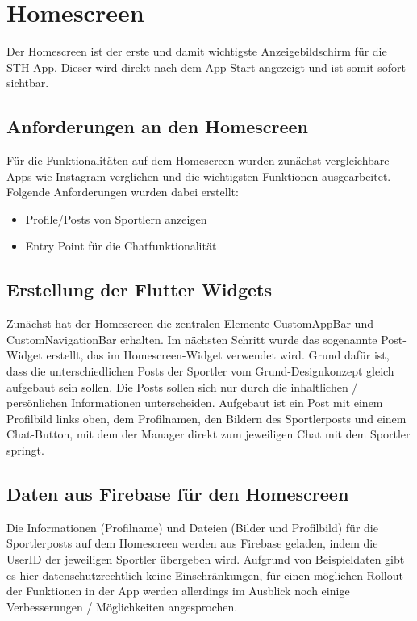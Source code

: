 \chapter{Homescreen}
Der Homescreen ist der erste und damit wichtigste Anzeigebildschirm für die STH-App. 
Dieser wird direkt nach dem App Start angezeigt und ist somit sofort sichtbar.
\section{Anforderungen an den Homescreen}
Für die Funktionalitäten auf dem Homescreen wurden zunächst vergleichbare Apps wie Instagram verglichen und die wichtigsten Funktionen ausgearbeitet.\newline
Folgende Anforderungen wurden dabei erstellt:
\begin{itemize}
    \item Profile/Posts von Sportlern anzeigen
    \item Entry Point für die Chatfunktionalität
\end{itemize}

\section{Erstellung der Flutter Widgets}
Zunächst hat der Homescreen die zentralen Elemente CustomAppBar und CustomNavigationBar erhalten.
Im nächsten Schritt wurde das sogenannte Post-Widget erstellt, das im Homescreen-Widget verwendet wird.
Grund dafür ist, dass die unterschiedlichen Posts der Sportler vom Grund-Designkonzept gleich aufgebaut sein sollen. 
Die Posts sollen sich nur durch die inhaltlichen / persönlichen Informationen unterscheiden.\newline
Aufgebaut ist ein Post mit einem Profilbild links oben, dem Profilnamen, den Bildern des Sportlerposts und einem Chat-Button, mit dem der Manager direkt zum jeweiligen Chat mit dem Sportler springt.

\section{Daten aus Firebase für den Homescreen}
Die Informationen (Profilname) und Dateien (Bilder und Profilbild) für die Sportlerposts auf dem Homescreen werden aus Firebase geladen, indem die UserID der jeweiligen Sportler übergeben wird.
Aufgrund von Beispieldaten gibt es hier datenschutzrechtlich keine Einschränkungen, für einen möglichen Rollout der Funktionen in der App werden allerdings im Ausblick noch einige Verbesserungen / Möglichkeiten angesprochen.

